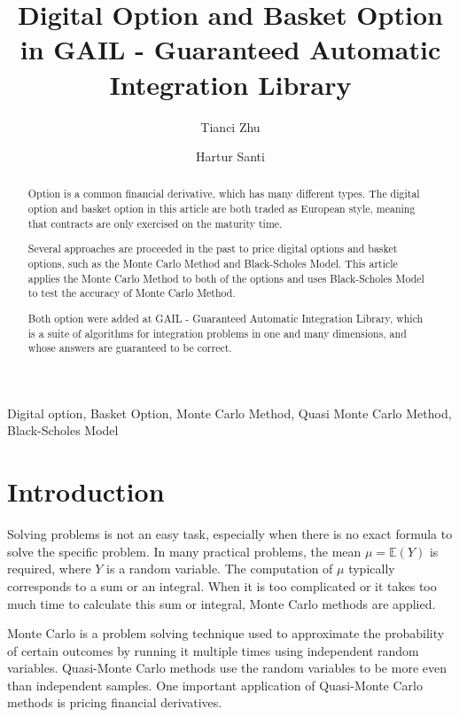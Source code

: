 \documentclass[]{elsarticle}
\theoremstyle{definition}
\theoremstyle{remark}
\begin{document}
\begin{frontmatter}
\title{Digital Option and Basket Option in GAIL - Guaranteed Automatic Integration Library}
\author{Tianci Zhu}
\author{Hartur Santi}
\address{Department of Applied Mathematics, Illinois Institute of Technology, Illinois, USA}

\begin{abstract}

Option is a common financial derivative, which has many different types. The digital option and basket option in this article are both traded as European style, meaning that contracts are only exercised on the maturity time.

Several approaches are proceeded in the past to price digital options and basket options, such as the Monte Carlo Method and Black-Scholes Model. This article applies the Monte Carlo Method to both of the options and uses Black-Scholes Model to test the accuracy of Monte Carlo Method.

Both option were added at GAIL - Guaranteed Automatic Integration Library, which is a suite of algorithms for integration problems in one and many dimensions, and whose answers are guaranteed to be correct.

\end{abstract}

\begin{keyword}
Digital option, Basket Option, Monte Carlo Method, Quasi Monte Carlo Method, Black-Scholes Model
\end{keyword}
\end{frontmatter}

\section{Introduction}

Solving problems is not an easy task, especially when there is no exact formula to solve the specific problem. In many practical problems, the mean $\mu=\mathbb{E}(Y)$ is required, where $Y$ is a random variable. The computation of $\mu$ typically corresponds to a sum or an integral. When it is too complicated or it takes too much time to calculate this sum or integral, Monte Carlo methods are applied.

Monte Carlo is a problem solving technique used to approximate the probability of certain outcomes by running it multiple times using independent random variables. Quasi-Monte Carlo methods use the random variables to be more even than independent samples. One important application of Quasi-Monte Carlo methods is pricing financial derivatives.
\end{document}

